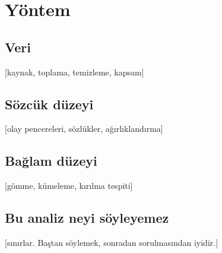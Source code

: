 \section{Yöntem}


\subsection*{Veri}
[kaynak, toplama, temizleme, kapsam]

\subsection*{Sözcük düzeyi}
[olay pencereleri, sözlükler, ağırlıklandırma]

\subsection*{Bağlam düzeyi}
[gömme, kümeleme, kırılma tespiti]

\subsection*{Bu analiz neyi söyleyemez}
[sınırlar. Baştan söylemek, sonradan sorulmasından iyidir.]
